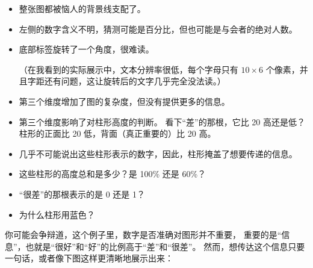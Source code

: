 \begin{itemize}
\item
  整张图都被恼人的背景线支配了。
\item
  左侧的数字含义不明，猜测可能是百分比，但也可能是与会者的绝对人数。
\item
  底部标签旋转了一个角度，很难读。

  （在我看到的实际展示中，文本分辨率很低，每个字母只有 $10 \times 6$ 个像素，并且字距还有问题，这让旋转后的文字几乎完全没法读。）
\item
  第三个维度增加了图的复杂度，但没有提供更多的信息。
\item
  第三个维度影响了对柱形高度的判断。
  看下“差”的那根，它比 20 高还是低？
  柱形的正面比 20 低，背面（真正重要的）比 20 高。
\item
  几乎不可能说出这些柱形表示的数字，因此，柱形掩盖了想要传递的信息。
\item
  这些柱形的高度总和是多少？是 100\% 还是 60\%？
\item
  “很差”的那根表示的是 0 还是 1？
\item
  为什么柱形用蓝色？
\end{itemize}

\bohs

你可能会争辩道，这个例子里，数字是否准确对图形并不重要，
重要的是“信息”，也就是“很好”和“好”的比例高于“差”和“很差”。
然而，想传达这个信息只要一句话，或者像下图这样更清晰地展示出来：

